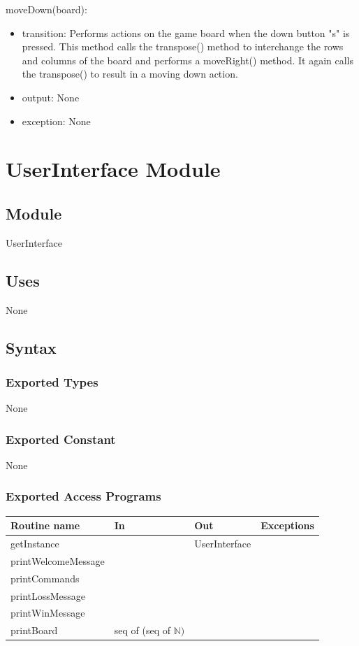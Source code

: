 \documentclass[12pt]{article}
\begin{document}
\noindent moveDown(board):
\begin{itemize}
    \item transition: Performs actions on the game board when the down button "s" is pressed. This method calls the transpose() method to interchange the rows and columns of the board and performs a moveRight() method. It again calls the transpose() to result in a moving down action.
    \item output: None
    \item exception: None
\end{itemize}

\newpage

\section* {UserInterface Module}

\subsection*{Module}
UserInterface

\subsection* {Uses}
None
\subsection* {Syntax}
\subsubsection* {Exported Types}
None
\subsubsection* {Exported Constant}
None
\subsubsection* {Exported Access Programs}
\begin{tabular}{| l | l | l | l |}
\hline
\textbf{Routine name} & \textbf{In} & \textbf{Out} & \textbf{Exceptions}\\
\hline
getInstance &  & UserInterface & \\
\hline
printWelcomeMessage &  &  & \\
\hline
printCommands &  &  & \\
\hline
printLossMessage &  &  & \\
\hline
printWinMessage &  &  & \\
\hline
printBoard & seq of (seq of $\mathbb{N})$ &  & \\
\hline
\end{tabular}
\end{document}
